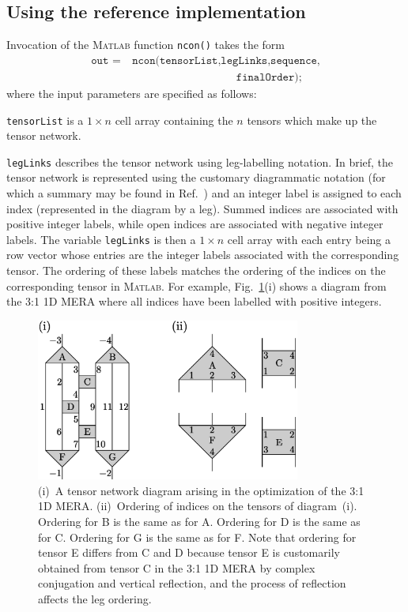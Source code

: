 \documentclass[aps,prb,reprint,superscriptaddress,amsmath,amsfonts]{revtex4-1}
\theoremstyle{definition}
\newcommand{\fref}[1]{Fig.~\ref{#1}}
\newcommand{\rcite}[1]{Ref.~\onlinecite{#1}}
\newcommand{\MATLAB}{\textsc{Matlab}}
\newcommand{\ttt}[1]{\texttt{#1}}
\begin{document}
\subsection{Using the reference implementation\label{sec:usage}}

Invocation of the \MATLAB{} function \ttt{ncon()} takes the form
\begin{align*}
\ttt{out~=} &~\ttt{ncon(tensorList,legLinks,sequence,}%
\\&\ttt{~~~~~~~~~~~~~~~~~~~~~~~~~~~~~finalOrder);}
\end{align*}
where the input parameters are specified as follows:

\ttt{tensorList} is a $1\times n$ cell array containing the $n$ tensors which make up the tensor network.

\ttt{legLinks} describes the tensor network using leg-labelling notation. In brief, the tensor network is represented using the customary diagrammatic notation (for which a summary may be found in \rcite{pfeifer2011b}) and an integer label is assigned to each index (represented in the diagram by a leg). Summed indices are associated with positive integer labels, while open indices are associated with negative integer labels. %
The variable \ttt{legLinks} is then a $1\times n$ cell array with each entry being a row vector whose entries are the integer labels associated with the corresponding tensor. The ordering of these labels matches the ordering of the indices on the corresponding tensor in \MATLAB{}. For example, \fref{fig:labelledMERA}(i) shows a diagram from the 3:1 1D MERA where all indices have been labelled with positive integers. 
\begin{figure}
\includegraphics[width=246.0pt]{labelledMERA}
\caption{(i)~A tensor network diagram arising in the optimization of the 3:1 1D MERA. (ii)~Ordering of indices on the tensors of diagram~(i). Ordering for B is the same as for A. Ordering for D is the same as for C. Ordering for G is the same as for F. Note that ordering for tensor E differs from C and D because tensor E is customarily obtained from tensor C in the 3:1 1D MERA by complex conjugation and vertical reflection, and the process of reflection affects the leg ordering. %
\label{fig:labelledMERA}}
\end{figure}%
\end{document}
